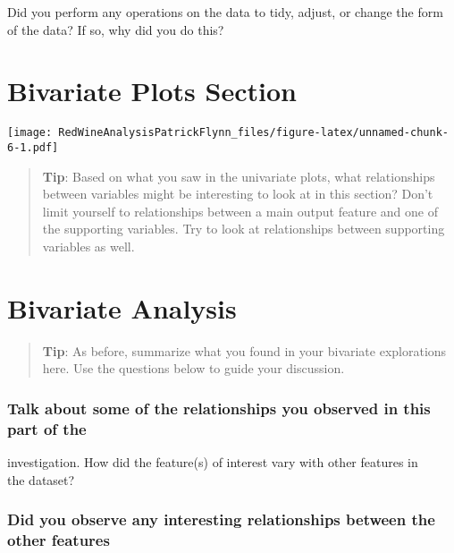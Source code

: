 \documentclass[]{article}
\begin{document}
Did you perform any operations on the data to tidy, adjust, or change
the form\\
of the data? If so, why did you do this?

\hypertarget{bivariate-plots-section}{%
\section{Bivariate Plots Section}\label{bivariate-plots-section}}

\texttt{[image: RedWineAnalysisPatrickFlynn\_files/figure-latex/unnamed-chunk-6-1.pdf]}

\begin{quote}
\textbf{Tip}: Based on what you saw in the univariate plots, what
relationships between variables might be interesting to look at in this
section? Don't limit yourself to relationships between a main output
feature and one of the supporting variables. Try to look at
relationships between supporting variables as well.
\end{quote}

\hypertarget{bivariate-analysis}{%
\section{Bivariate Analysis}\label{bivariate-analysis}}

\begin{quote}
\textbf{Tip}: As before, summarize what you found in your bivariate
explorations here. Use the questions below to guide your discussion.
\end{quote}

\hypertarget{talk-about-some-of-the-relationships-you-observed-in-this-part-of-the}{%
\subsubsection{\texorpdfstring{Talk about some of the relationships you
observed in this part of the\\
}{Talk about some of the relationships you observed in this part of the }}\label{talk-about-some-of-the-relationships-you-observed-in-this-part-of-the}}

investigation. How did the feature(s) of interest vary with other
features in\\
the dataset?

\hypertarget{did-you-observe-any-interesting-relationships-between-the-other-features}{%
\subsubsection{\texorpdfstring{Did you observe any interesting
relationships between the other features\\
}{Did you observe any interesting relationships between the other features }}\label{did-you-observe-any-interesting-relationships-between-the-other-features}}
\end{document}
